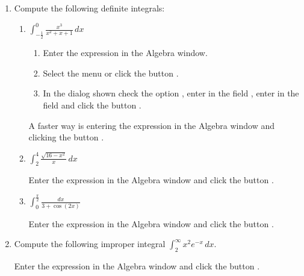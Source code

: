 \begin{enumerate}[leftmargin=*]
\item Compute the following definite integrals:
\begin{enumerate}
\item $\displaystyle \int_{-\frac{1}{2}}^0 \frac{x^{3}}{x^{2}+x+1}\,dx$
\begin{indication}
\begin{enumerate}
\item Enter the expression  in the Algebra window.
\item Select the menu  or click the button .
\item In the dialog shown check the option , enter  in the field , enter  in the field  and click the button .
\end{enumerate}
A faster way is entering the expression  in the Algebra window and clicking the button .
\end{indication}

\item $\displaystyle \int_2^4 \frac{\sqrt{16-x^{2}}}{x}\,dx$
\begin{indication}
Enter the expression  in the Algebra window and click the button .
\end{indication}

\item $\displaystyle \int_0^{\frac{\pi}{2}} \frac{dx}{3+\cos(2x)}$
\begin{indication}
Enter the expression  in the Algebra window and click the button .
\end{indication}
\end{enumerate}


\item Compute the following improper integral $\int_2^{\infty} x^2e^{-x}\,dx$.
\begin{indication}
Enter the expression  in the Algebra window and click the button .
\end{indication}



\end{enumerate}
